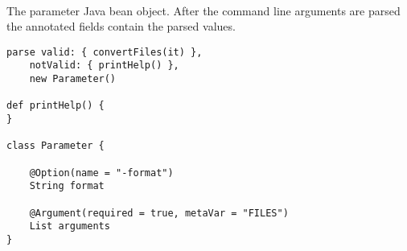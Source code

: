 \begin{asparadesc}
%
\item[\code{theParameter}] \hfill \\
The parameter Java bean object. After the command line arguments are parsed
the annotated fields contain the parsed values.
%
\end{asparadesc}

\begin{lstlisting}[style=Groovybash, label={lst:example_arguments_parse}]
parse valid: { convertFiles(it) },
    notValid: { printHelp() },
    new Parameter()
    
def printHelp() {
}

class Parameter {

    @Option(name = "-format")
    String format

    @Argument(required = true, metaVar = "FILES")
    List arguments
}

\end{lstlisting}

